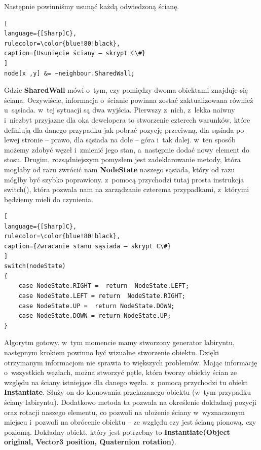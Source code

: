 \documentclass[oneside,polski,logo]{amuthesis}
\begin{document}
Następnie powinniśmy usunąć każdą odwiedzoną ścianę.

\begin{lstlisting}[
language={[Sharp]C},
rulecolor=\color{blue!80!black},
caption={Usunięcie ściany – skrypt C\#}
]
node[x ,y] &= ~neighbour.SharedWall;
\end{lstlisting}

Gdzie \textbf{SharedWall} mówi o~tym, czy pomiędzy dwoma obiektami znajduje się ściana. Oczywiście, informacja o~ścianie powinna zostać zaktualizowana również u~sąsiada. w~tej sytuacji są dwa wyjścia. Pierwszy z~nich, z~lekka naiwny i~niezbyt przyjazne dla oka dewelopera to stworzenie czterech warunków, które definiują dla danego przypadku jak pobrać pozycję przeciwną, dla sąsiada po lewej stronie – prawo, dla sąsiada na dole – góra i~tak dalej. w~ten sposób możemy zdobyć węzeł i~zmienić jego stan, a~następnie dodać nowy element do stosu. Drugim, rozsądniejszym pomysłem jest zadeklarowanie metody, która mogłaby od razu zwrócić nam \textbf{NodeState} naszego sąsiada, który od razu mógłby być szybko poprawiony. z~pomocą przychodzi tutaj prosta instrukcja switch(), która pozwala nam na zarządzanie czterema przypadkami, z~którymi będziemy mieli do czynienia.


\begin{lstlisting}[
language={[Sharp]C},
rulecolor=\color{blue!80!black},
caption={Zwracanie stanu sąsiada – skrypt C\#}
]
switch(nodeState)
{
	case NodeState.RIGHT =  return  NodeState.LEFT;
	case NodeState.LEFT = return  NodeState.RIGHT;
	case NodeState.UP =  return NodeState.DOWN;
	case NodeState.DOWN = return NodeState.UP;
}
\end{lstlisting}

Algorytm gotowy. w~tym momencie mamy stworzony generator labiryntu, następnym krokiem powinno być wizualne stworzenie obiektu. Dzięki otrzymanym informacjom nie sprawia to większych problemów. Mając informację o~wszystkich węzłach, można stworzyć pętle, która tworzy obiekty ścian ze względu na ściany istniejące dla danego węzła. z~pomocą przychodzi tu obiekt \textbf{Instantiate}. Służy on do klonowania przekazanego obiektu (w~tym przypadku ściany labiryntu). Dodatkowo metoda ta pozwala na określenie dokładnej pozycji oraz rotacji naszego elementu, co pozwoli na ułożenie ściany w~wyznaczonym miejscu i~pozwoli na obrócenie obiektu – ze względu czy jest ścianą pionową, czy poziomą. Dokładny obiekt, który jest potrzebny to \textbf{Instantiate(Object original, Vector3 position, Quaternion rotation)}. \cite{Instantiate}
\end{document}

